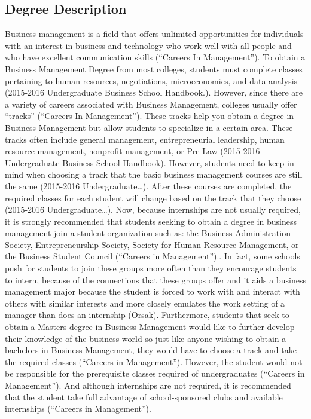 \begin{multicols}{2}
\section{Degree Description}
    Business management is a field that offers unlimited opportunities for individuals with an interest in business and technology who work well with all people and who have excellent communication skills (“Careers In Management”). To obtain a Business Management Degree from most colleges, students must complete classes pertaining to human resources, negotiations, microeconomics, and data analysis (2015-2016 Undergraduate Business School Handbook.). However, since there are a variety of careers associated with Business Management, colleges usually offer “tracks” (“Careers In Management”). These tracks help you obtain a degree in Business Management but allow students to specialize in a certain area. These tracks often include general management, entrepreneurial leadership, human resource management, nonprofit management, or Pre-Law (2015-2016 Undergraduate Business School Handbook). However, students need to keep in mind when choosing a track that the basic business management courses are still the same (2015-2016 Undergraduate…). After these courses are completed, the required classes for each student will change based on the track that they choose (2015-2016 Undergraduate…). Now, because internships are not usually required, it is strongly recommended that students seeking to obtain a degree in business management join a student organization such as: the Business Administration Society, Entrepreneurship Society, Society for Human Resource Management, or the Business Student Council (“Careers in Management”).. In fact, some schools push for students to join these groups more often than they encourage students to intern, because of the connections that these groups offer and it aids a business management major because the student is forced to work with and interact with others with similar interests and more closely emulates the work setting of a manager than does an internship (Orsak). Furthermore, students that seek to obtain a Masters degree in Business Management would like to further develop their knowledge of the business world so just like anyone wishing to obtain a bachelors in Business Management, they would have to choose a track and take the required classes (“Careers in Management”). However, the student would not be responsible for the prerequisite classes required of undergraduates (“Careers in Management”). And although internships are not required, it is recommended that the student take full advantage of school-sponsored clubs and available internships (“Careers in Management”).

\end{multicols}
